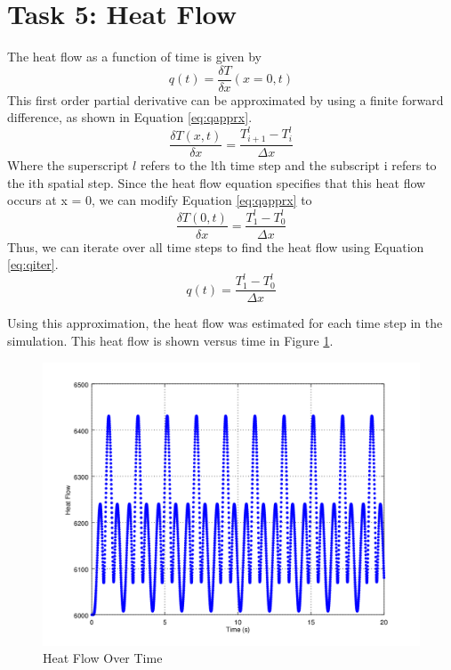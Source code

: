 \documentclass[12pt]{amsart}
\begin{document}
\section{Task 5: Heat Flow} \label{heatflowsection}
The heat flow as a function of time is given by
\begin{equation}
q(t) = \frac{\delta T}{\delta x}(x=0,t) 
\end{equation}
This first order partial derivative can be approximated by using a finite forward difference, as shown in Equation \ref{eq:qapprx}. 
\begin{equation}
\label{eq:qapprx}
\frac{\delta T(x,t)}{\delta x} = \frac{T^l_{i+1} - T^l_i}{\Delta x}
\end{equation}
Where the superscript $l$ refers to the lth time step and the subscript i refers to the ith spatial step.
Since the heat flow equation specifies that this heat flow occurs at x = 0, we can modify Equation \ref{eq:qapprx} to
\begin{equation}
\frac{\delta T(0,t)}{\delta x} = \frac{T^l_{1} - T^l_0}{\Delta x}
\end{equation}
Thus, we can iterate over all time steps to find the heat flow using Equation \ref{eq:qiter}. 
\begin{equation}
\label{eq:qiter}
q(t) = \frac{T^l_{1} - T^l_0}{\Delta x}
\end{equation}

Using this approximation, the heat flow was estimated for each time step in the simulation. This heat flow is shown versus time in Figure \ref{fig:q}.

\begin{center}
\begin{figure}
\includegraphics[scale=0.7]{task5fig}
\caption{Heat Flow Over Time}
\label{fig:q}
\end{figure}
\end{center}
\end{document}
